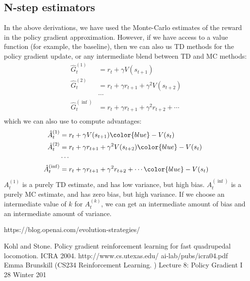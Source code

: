 \documentclass{article}
\begin{document}
\subsection{N-step estimators}
In the above derivations, we have used the Monte-Carlo estimates of the reward in the policy gradient approximation. However, if we have access to a value function (for example, the baseline), then we can also us TD methods for the policy gradient update, or any intermediate blend between TD and MC methods:
\begin{align*}
\hat{G}_t^{(1)} &= r_t + \gamma V(s_{t+1})  \\
\hat{G}_t^{(2)} &= r_t + \gamma r_{t+1} + \gamma^2 V(s_{t+2}) \\
& \cdots \\
\hat{G}_t^{(\inf)} &= r_t + \gamma r_{t+1} + \gamma^2 r_{t+2} + \cdots \\
\end{align*}
which we can also use to compute advantages:
\begin{align*}
\hat{A}_t^{(1)} &= r_t + \gamma V(s_{t+1}) {\color{blue} - V(s_t)} \\
\hat{A}_t^{(2)} &= r_t + \gamma r_{t+1} + \gamma^2 V(s_{t+2}) {\color{blue} - V(s_t)}\\
&\cdots \\
\hat{A}_t^{(\inf)} &= r_t + \gamma r_{t+1} + \gamma^2 r_{t+2} + \cdots {\color{blue} - V(s_t)}\\
\end{align*}
$A_t^{(1)}$ is a purely TD estimate, and has low variance, but high bias. $A_t^{(\inf)}$ is a purely MC estimate, and has zero bias, but high variance. If we choose an intermediate value of $k$ for $A_t^{(k)}$, we can get an intermediate amount of bias and an intermediate amount of variance.



\begin{thebibliography}{9}

https://blog.openai.com/evolution-strategies/

Kohl and Stone. Policy gradient reinforcement learning for fast quadrupedal
locomotion. ICRA 2004. http://www.cs.utexas.edu/ ai-lab/pubs/icra04.pdf
Emma Brunskill (CS234 Reinforcement Learning. ) Lecture 8: Policy Gradient I 28 Winter 201
\end{thebibliography}
\end{document}
